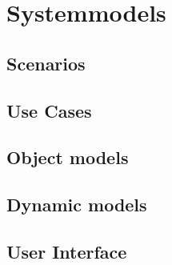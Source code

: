 \chapter{Systemmodels}
\label{ch:sysmodels}

\section{Scenarios}
\section{Use Cases}
\section{Object models}
\section{Dynamic models}
\section{User Interface}
